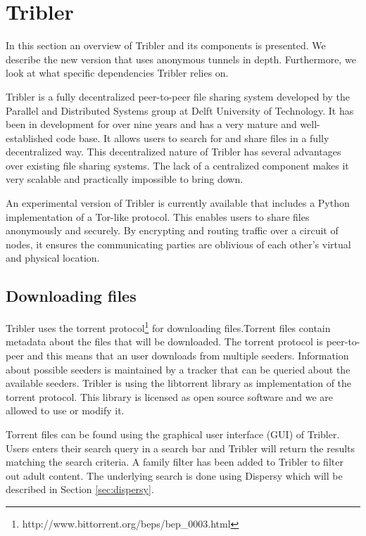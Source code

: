 
\section{Tribler}
	\label{sec:tribler}
	In this section an overview of Tribler and its components is presented. We describe the new version that uses anonymous tunnels in depth. Furthermore, we look at what specific dependencies Tribler relies on.

	Tribler is a fully decentralized peer-to-peer file sharing system developed by the Parallel and Distributed Systems group at Delft University of Technology. It has been in development for over nine years and has a very mature and well-established code base. It allows users to search for and share files in a fully decentralized way. This decentralized nature of Tribler has several advantages over existing file sharing systems. The lack of a centralized component makes it very scalable and practically impossible to bring down.

	An experimental version of Tribler is currently available that includes a Python implementation of a Tor-like protocol. This enables users to share files anonymously and securely. By encrypting and routing traffic over a circuit of nodes, it ensures the communicating parties are oblivious of each other's virtual and physical location.
	
	\subsection{Downloading files}
		Tribler uses the torrent protocol\footnote{http://www.bittorrent.org/beps/bep\_0003.html} for downloading files.Torrent files contain metadata about the files that will be downloaded. The torrent protocol is peer-to-peer and this means that an user downloads from multiple seeders. Information about possible seeders is maintained by a tracker that can be queried about the available seeders. Tribler is using the libtorrent library as implementation of the torrent protocol. This library is licensed as open source software and we are allowed to use or modify it.
		
		Torrent files can be found using the graphical user interface (GUI) of Tribler. Users enters their search query in a search bar and Tribler will return the results matching the search criteria. A family filter has been added to Tribler to filter out adult content. The underlying search is done using Dispersy which will be described in Section \ref{sec:dispersy}.
	
